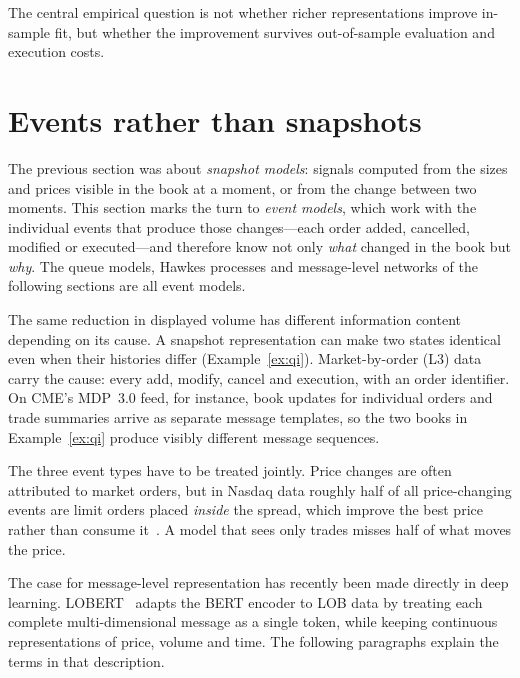 The central empirical question is not whether richer representations improve in-sample fit, but
whether the improvement survives out-of-sample evaluation and execution costs.

\section{Events rather than snapshots}
\label{sec:events}

The previous section was about \emph{snapshot models}: signals computed from the sizes and prices visible
in the book at a moment, or from the change between two moments. This section marks the turn to
\emph{event models}, which work with the individual events that produce those changes---each order
added, cancelled, modified or executed---and therefore know not only \emph{what} changed in the book but
\emph{why}. The queue models, Hawkes processes and message-level networks of the following sections are
all event models.

The same reduction in displayed volume has different information content depending on its cause.
A snapshot representation can make two states identical even when their histories differ
(Example~\ref{ex:qi}). Market-by-order (L3) data carry the cause: every add, modify, cancel and
execution, with an order identifier. On CME's MDP~3.0 feed, for instance, book updates for
individual orders and trade summaries arrive as separate message templates, so the two books in
Example~\ref{ex:qi} produce visibly different message sequences.

The three event types have to be treated jointly. Price changes are often attributed to market
orders, but in Nasdaq data roughly half of all price-changing events are limit orders placed
\emph{inside} the spread, which improve the best price rather than consume it~\citep{eisler2012}.
A model that sees only trades misses half of what moves the price.

The case for message-level representation has recently been made directly in deep learning.
LOBERT~\citep{linna2025lobert} adapts the BERT encoder to LOB data by treating each complete
multi-dimensional message as a single token, while keeping continuous representations of price,
volume and time. The following paragraphs explain the terms in that description.

